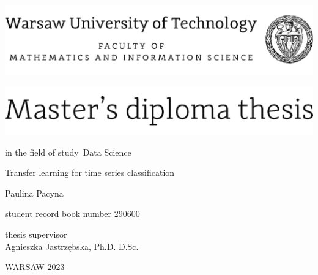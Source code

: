 \documentclass[12pt,twoside,a4paper]{article}
\newcommand{\discipline}{Data Science}
\renewcommand{\title}{Transfer learning for time series classification}
\newcommand{\supervisor}{Agnieszka Jastrzębska, Ph.D. D.Sc.}
\newcommand{\spec}{Data Science}
\renewcommand{\year}{2023}
\newcommand{\authori}{Paulina Pacyna}
\newcommand{\albumi}{290600}
\begin{document}
\pagestyle{empty}


\begin{center}
\includegraphics[scale=1.]{img/wut}
\vspace{40pt}


\includegraphics[scale=1.]{img/master} %

{ \arial
in the field of study~\discipline

\vspace{30pt}
{\arial \large \title}


\vspace{40pt}

{\arial \huge \authori }

\vspace{5pt}

student record book number \albumi


\vspace{40pt}

thesis supervisor \\
{\arial \supervisor}


\vfill

WARSAW \year \\
}
\end{center}


%
%
\end{document}
